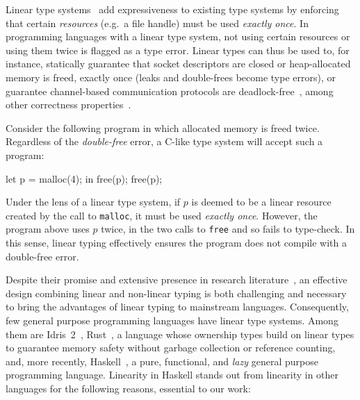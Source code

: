 \documentclass[acmsmall, screen, review]{acmart}
\begin{document}
Linear type systems~\cite{cite:linear-logic,cite:barberdill} add expressiveness
to existing type systems by enforcing that certain \emph{resources} (e.g.~a
file handle) must be used \emph{exactly once}.
%
In programming languages with a linear type system, not using certain resources
or using them twice is flagged as a type error. Linear types can thus be used
to, for instance, statically guarantee that socket descriptors are closed or
heap-allocated memory is freed, exactly once (leaks and double-frees become
type errors), or guarantee channel-based communication protocols are
deadlock-free~\cite{10.1007/978-3-642-15375-4_16},
among other correctness properties~\cite{10.1145/3373718.3394765,10.1145/3527313,cite:linearhaskell}.

Consider the following program in which allocated memory is freed twice.
Regardless of the \emph{double-free} error, a C-like type system will
accept such a program:
\begin{code}
let p = malloc(4); in free(p); free(p);
\end{code}
Under the lens of a linear type system, if $p$ is deemed to be a
linear resource created by the call to \texttt{malloc}, it
must be used \emph{exactly once}.  However, the program above uses $p$ twice,
in the two calls to \texttt{free} and so fails to type-check.
%
In this sense, linear typing
effectively ensures the program does not compile with a double-free error.

Despite their promise and extensive presence in research
literature~\cite{Wadler1990LinearTC,CERVESATO2000133,10.1093/logcom/2.3.297},
an effective design combining linear and non-linear typing is both
challenging and necessary to bring the advantages of linear typing to
mainstream languages.
%
Consequently, few general purpose programming languages have linear
type systems. Among them are Idris~2~\cite{brady:LIPIcs.ECOOP.2021.9},
Rust~\cite{10.1145/2692956.2663188}, a language whose
ownership types build on linear types to guarantee memory safety
without garbage collection or reference counting, and, more recently,
Haskell~\cite{cite:linearhaskell}, a pure, functional, and
\emph{lazy} general purpose programming language.
%
%
Linearity in Haskell stands out from linearity in other languages for the
following reasons, essential to our work:
\end{document}
